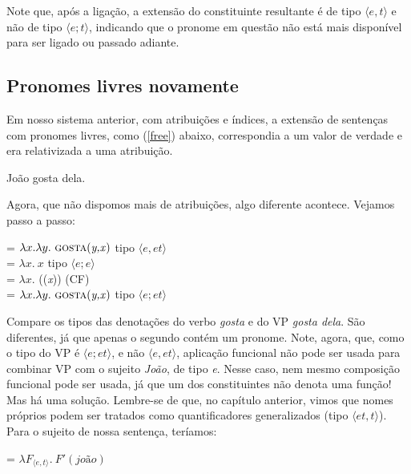 \n Note que, após a ligação, a extensão do constituinte resultante é de tipo $\langle e,t \rangle$ e não de tipo $\langle e;t \rangle$, indicando que o pronome em questão não está mais disponível para ser ligado ou passado adiante.

		
\subsection{Pronomes livres novamente}

Em nosso sistema anterior, com atribuições e índices, a extensão de sentenças com pronomes livres, como (\ref{free}) abaixo, correspondia a um valor de verdade e era relativizada a uma atribuição.

\begin{exe}
	\ex João gosta dela. \label{free}
\end{exe}

\n Agora, que não dispomos mais de atribuições, algo diferente acontece. Vejamos passo a passo:

\begin{exe}
	\ex {} = $\lambda x. \lambda y.\ \predica{gosta}{y,x}$ \hfill tipo $\langle e,et \rangle$ \\
	 = $\lambda x.\ x$ \hfill tipo $\langle e;e \rangle$ \\
	 = $\lambda x.$ ((\textit{x})) \hfill (CF) \\
	 = $\lambda x. \lambda y.\ \predica{gosta}{y,x}$ \hfill tipo $\langle e;et \rangle$
\end{exe}

\n Compare os tipos das denotações do verbo \textit{gosta} e do VP \textit{gosta dela}. São diferentes, já que apenas o segundo contém um pronome. Note, agora, que, como o tipo do VP é $\langle e;et \rangle$, e não $\langle e,et \rangle$, aplicação funcional não pode ser usada para combinar VP com o sujeito \textit{João}, de tipo \textit{e}. Nesse caso, nem mesmo composição funcional pode ser usada, já que um dos constituintes não denota uma função! Mas há uma solução. Lembre-se de que, no capítulo anterior, vimos que nomes próprios podem ser tratados como quantificadores generalizados (tipo $\langle et,t \rangle$). Para o sujeito de nossa sentença, teríamos:

\begin{exe}
	\ex {} = $\lambda F_{\langle e,t\rangle}.\ F'(\textit{joão})$
\end{exe}

